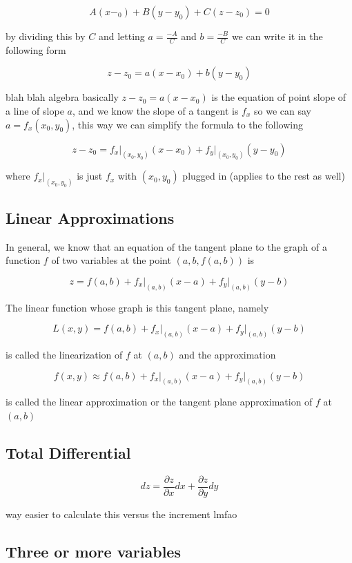 \documentclass{article}
\begin{document}
$$A(x-_0) + B(y-y_0) + C(z-z_0) = 0$$

by dividing this by $C$ and letting $a= \frac{-A}{C}$ and $b = \frac{-B}{C}$ we can write it in the following form

$$z - z_0 = a(x-x_0) + b(y - y_0)$$

blah blah algebra basically $z - z_0 = a(x-x_0)$ is the equation of point slope of a line of slope $a$, and we know the slope of a tangent is $f_x$ so we can say $a = f_x(x_0,y_0)$, this way we can simplify the formula to the following

$$z - z_0 = f_x \big\rvert_{(x_0,y_0)}(x-x_0) + f_y \big\rvert_{(x_0, y_0)}(y-y_0)$$

where $f_x \big\rvert_{(x_0,y_0)}$ is just $f_x$ with $(x_0, y_0)$ plugged in (applies to the rest as well)


\subsection{Linear Approximations}

In general, we know that an equation of the tangent plane to the graph of a function $f$ of two variables at the point $(a,b,f(a,b))$ is 

$$z = f(a,b) + f_x\big\rvert_{(a,b)}(x-a) + f_y\big\rvert_{(a,b)}(y-b)$$

The linear function whose graph is this tangent plane, namely

$$L(x,y) = f(a,b) + f_x\big\rvert_{(a,b)}(x-a) + f_y\big\rvert_{(a,b)}(y-b)$$

is called the linearization of $f$ at $(a,b)$ and the approximation

$$f(x,y) \approx f(a,b) + f_x\big\rvert_{(a,b)}(x-a) + f_y\big\rvert_{(a,b)}(y-b)$$

is called the linear approximation or the tangent plane approximation of $f$ at $(a,b)$


\subsection{Total Differential}

$$dz = \frac{\partial z}{\partial x}dx + \frac{\partial z}{\partial y}dy $$

way easier to calculate this versus the increment lmfao 


\subsection{Three or more variables}
\end{document}

